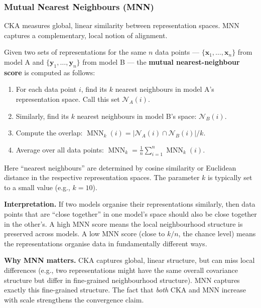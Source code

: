 \documentclass[11pt, a4paper]{article}
\begin{document}
\subsubsection{Mutual Nearest Neighbours (MNN)}

CKA measures global, linear similarity between representation spaces. MNN
captures a complementary, local notion of alignment.

\begin{definition}[title={Mutual Nearest Neighbours}]
Given two sets of representations for the same $n$ data points ---
$\{\mathbf{x}_1, \ldots, \mathbf{x}_n\}$ from model A and
$\{\mathbf{y}_1, \ldots, \mathbf{y}_n\}$ from model B --- the
\textbf{mutual nearest-neighbour score} is computed as follows:
\begin{enumerate}[leftmargin=1.5em]
  \item For each data point $i$, find its $k$ nearest neighbours in model
    A's representation space. Call this set $\mathcal{N}_A(i)$.
  \item Similarly, find its $k$ nearest neighbours in model B's space:
    $\mathcal{N}_B(i)$.
  \item Compute the overlap: $\operatorname{MNN}_k(i) =
    |\mathcal{N}_A(i) \cap \mathcal{N}_B(i)| / k$.
  \item Average over all data points:
    $\operatorname{MNN}_k = \frac{1}{n}\sum_{i=1}^{n}
    \operatorname{MNN}_k(i)$.
\end{enumerate}
Here ``nearest neighbours'' are determined by cosine similarity or
Euclidean distance in the respective representation spaces. The parameter
$k$ is typically set to a small value (e.g., $k = 10$).
\end{definition}

\textbf{Interpretation.} If two models organise their representations
similarly, then data points that are ``close together'' in one model's
space should also be close together in the other's. A high MNN score
means the local neighbourhood structure is preserved across models.
A low MNN score (close to $k/n$, the chance level) means the
representations organise data in fundamentally different ways.

\textbf{Why MNN matters.} CKA captures global, linear structure, but can
miss local differences (e.g., two representations might have the same
overall covariance structure but differ in fine-grained neighbourhood
structure). MNN captures exactly this fine-grained structure. The fact
that \emph{both} CKA and MNN increase with scale strengthens the
convergence claim.
\end{document}
